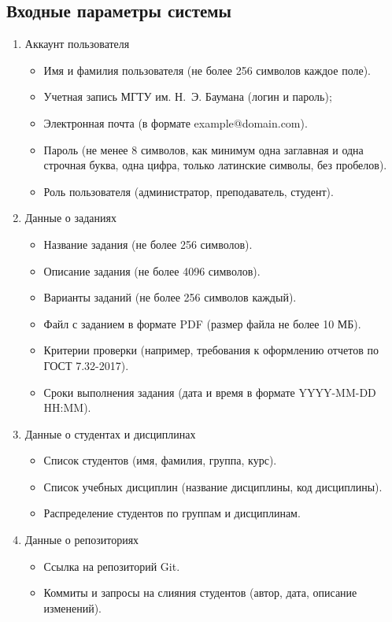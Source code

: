 \subsection*{Входные параметры системы}

\begin{enumerate}
	\item Аккаунт пользователя
	\begin{itemize} 
		\item Имя и фамилия пользователя (не более 256 символов каждое поле).
		\item Учетная запись МГТУ им. Н.~Э. Баумана (логин и пароль);
		\item Электронная почта (в формате example@domain.com).
		\item Пароль (не менее 8 символов, как минимум одна заглавная и одна строчная буква, одна цифра, только латинские символы, без пробелов).
		\item Роль пользователя (администратор, преподаватель, студент).
	\end{itemize}
	\item Данные о заданиях
	\begin{itemize} 
		\item Название задания (не более 256 символов).
		\item Описание задания (не более 4096 символов).
		\item Варианты заданий (не более 256 символов каждый).
		\item Файл с заданием в формате PDF (размер файла не более 10 МБ).
		\item Критерии проверки (например, требования к оформлению отчетов по ГОСТ 7.32-2017).
		\item Сроки выполнения задания (дата и время в формате YYYY-MM-DD HH:MM).
	\end{itemize}
	\item Данные о студентах и дисциплинах
	\begin{itemize} 
		\item Список студентов (имя, фамилия, группа, курс).
		\item Список учебных дисциплин (название дисциплины, код дисциплины).
		\item Распределение студентов по группам и дисциплинам.
	\end{itemize}
	\item Данные о репозиториях
	\begin{itemize} 
		\item Ссылка на репозиторий Git.
		\item Коммиты и запросы на слияния студентов (автор, дата, описание изменений).

\end{itemize}
\end{enumerate}
